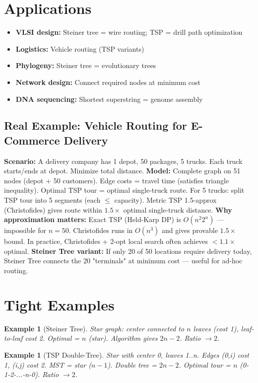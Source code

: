 \documentclass[11pt,oneside]{book}
\newtheorem{example}[theorem]{Example}
\begin{document}
\section{Applications}
\begin{itemize}
    \item \textbf{VLSI design:} Steiner tree = wire routing; TSP = drill path optimization
    \item \textbf{Logistics:} Vehicle routing (TSP variants)
    \item \textbf{Phylogeny:} Steiner tree = evolutionary trees
    \item \textbf{Network design:} Connect required nodes at minimum cost
    \item \textbf{DNA sequencing:} Shortest superstring = genome assembly
\end{itemize}

\subsection*{Real Example: Vehicle Routing for E-Commerce Delivery}
\textbf{Scenario:} A delivery company has 1 depot, 50 packages, 5 trucks. Each truck starts/ends at depot. Minimize total distance.
\textbf{Model:} Complete graph on 51 nodes (depot + 50 customers). Edge costs = travel time (satisfies triangle inequality). Optimal TSP tour = optimal single-truck route. For 5 trucks: split TSP tour into 5 segments (each $\leq$ capacity). Metric TSP 1.5-approx (Christofides) gives route within $1.5 \times$ optimal single-truck distance.
\textbf{Why approximation matters:} Exact TSP (Held-Karp DP) is $O(n^2 2^n)$ — impossible for $n=50$. Christofides runs in $O(n^3)$ and gives provable $1.5\times$ bound. In practice, Christofides + 2-opt local search often achieves $< 1.1\times$ optimal.
\textbf{Steiner Tree variant:} If only 20 of 50 locations require delivery today, Steiner Tree connects the 20 "terminals" at minimum cost — useful for ad-hoc routing.

\section{Tight Examples}

\begin{example}[Steiner Tree]
Star graph: center connected to $n$ leaves (cost 1), leaf-to-leaf cost 2. Optimal = $n$ (star). Algorithm gives $2n-2$. Ratio $\to 2$.
\end{example}

\begin{example}[TSP Double-Tree]
Star with center 0, leaves 1..n. Edges (0,i) cost 1, (i,j) cost 2. MST = star ($n-1$). Double tree = $2n-2$. Optimal tour = $n$ (0-1-2-...-n-0). Ratio $\to 2$.
\end{example}
\end{document}
